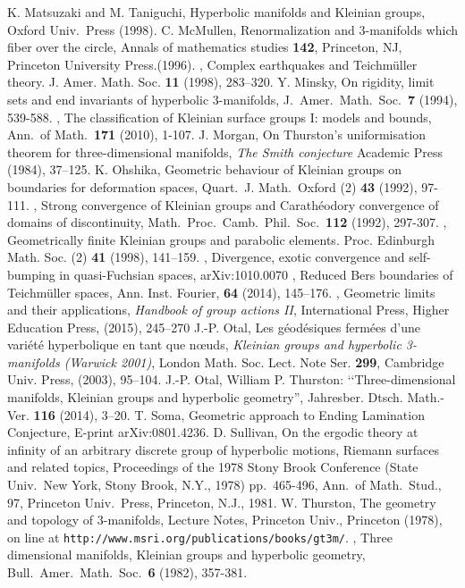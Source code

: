 \documentclass{amsart}
\theoremstyle{definition}
\numberwithin{figure}{section}
\numberwithin{equation}{section}
\begin{document}
\begin{thebibliography}{99}
 K. Matsuzaki and M. Taniguchi, Hyperbolic manifolds and Kleinian groups, Oxford Univ.\ Press (1998).
 C. McMullen,  Renormalization and 3-manifolds which fiber over the circle, Annals of mathematics studies {\bf 142}, Princeton, NJ, Princeton University Press.(1996).
 \bysame, Complex earthquakes and Teichm\"{u}ller theory. J. Amer. Math. Soc. {\bf 11} (1998),  283--320.
 Y. Minsky, On rigidity, limit sets and end invariants of hyperbolic $3$-manifolds, J.\ Amer.\ Math.\ Soc.\ {\bf 7} (1994), 539-588.
 \bysame, The classification of Kleinian surface groups I: models and bounds, 
Ann.\ of Math.\ {\bf 171} (2010), 1-107.
 J.  Morgan, On Thurston's uniformisation theorem for 
three-dimensional 
manifolds, {\em The Smith conjecture}  Academic Press (1984), 37--125.
 K. Ohshika, Geometric behaviour of Kleinian groups on boundaries for deformation spaces, Quart.\ J.  Math.\ Oxford (2) 
{\bf 43} (1992), 97-111.
 \bysame, Strong convergence of Kleinian groups and Carath\'{e}odory convergence of domains of discontinuity, Math.\ Proc.\ Camb.\ Phil.\ Soc.\ {\bf 112} (1992), 297-307.
\bysame, Geometrically finite Kleinian groups and parabolic elements. Proc. Edinburgh Math. Soc. (2) {\bf 41} (1998), 141--159.
\bysame, Divergence, exotic convergence and self-bumping in quasi-Fuchsian spaces, arXiv:1010.0070
\bysame, Reduced Bers boundaries of Teichm\"{u}ller spaces, Ann. Inst. Fourier, {\bf 64} (2014), 145--176.
\bysame, Geometric limits and their applications, {\em Handbook of group actions II}, International Press, Higher Education Press, (2015), 245--270
 J.-P. Otal, Les g\'{e}od\'{e}siques ferm\'{e}es d'une vari\'{e}t\'{e} hyperbolique en tant que n{\oe}uds,  {\em Kleinian groups and hyperbolic 3-manifolds (Warwick 2001)}, London Math. Soc. Lect. Note Ser. {\bf 299}, Cambridge Univ. Press, (2003), 95--104.
 J.-P. Otal, William P. Thurston: \lq\lq Three-dimensional manifolds, Kleinian groups and hyperbolic geometry'', Jahresber. Dtsch. Math.-Ver. {\bf 116} (2014),  3--20. 
 T. Soma, Geometric approach to Ending Lamination Conjecture, E-print arXiv:0801.4236.
 D. Sullivan, On the ergodic theory at infinity of an arbitrary discrete group of hyperbolic motions, Riemann surfaces and related topics, Proceedings of the 1978 Stony Brook Conference (State Univ.\ New York, 
Stony Brook, N.Y., 1978) pp.\ 465-496, Ann.\ of Math.\ Stud., 97, Princeton Univ.\ Press, Princeton, N.J., 1981.
 W. Thurston, The geometry and topology of $3$-manifolds, Lecture Notes, Princeton Univ., Princeton (1978), on line at {\tt http://www.msri.org/publications/books/gt3m/}.
 \bysame, Three dimensional manifolds, Kleinian groups and hyperbolic geometry, Bull.\ Amer.\ Math.\ Soc.\ {\bf 6} (1982), 357-381.
\end{thebibliography}
\end{document}
